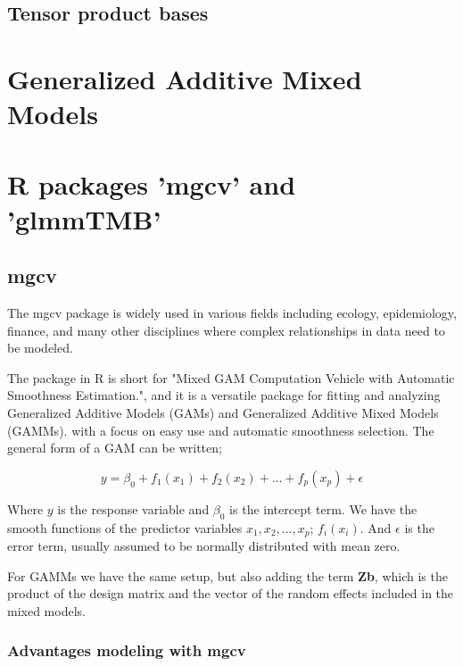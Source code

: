 \documentclass[12pt, twoside,hidelinks]{article}
\theoremstyle{definition}
\numberwithin{equation}{section}
\begin{document}
\subsection{Tensor product bases}



\section{Generalized Additive Mixed Models}


\section{R packages 'mgcv' and 'glmmTMB'}
\subsection{mgcv}

The mgcv package is widely used in various fields including ecology, epidemiology, finance, and many other disciplines where complex relationships in data need to be modeled.
\newline

The package in R is short for "Mixed GAM Computation Vehicle with Automatic Smoothness Estimation.", and it is a versatile package for fitting and analyzing Generalized Additive Models (GAMs) and Generalized Additive Mixed Models (GAMMs). with a focus on easy use and automatic smoothness selection. The general form of a GAM can be written;

\begin{equation}
    y = \beta_0 + f_1(x_1) + f_2(x_2) + \ldots + f_p(x_p) + \epsilon
\end{equation}


Where \( y \) is the response variable and \( \beta_0 \) is the intercept term.
We have the smooth functions of the predictor variables \( x_1, x_2, \ldots, x_p \); \( f_i(x_i) \).
And \( \epsilon \) is the error term, usually assumed to be normally distributed with mean zero.


For GAMMs we have the same setup, but also adding the term \textbf{Zb}, which is the product of the design matrix and the vector of the random effects included in the mixed models.


\subsubsection{Advantages modeling with mgcv}
\end{document}
